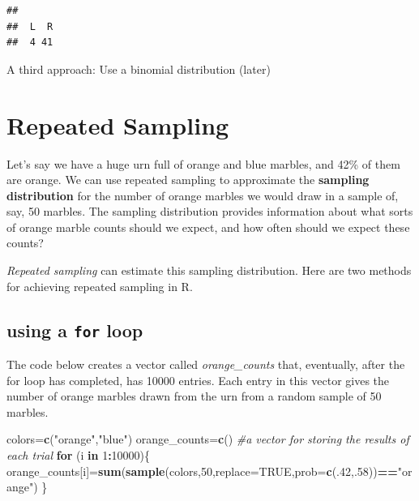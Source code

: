 \documentclass[
]{book}
\newenvironment{Shaded}{\begin{snugshade}}{\end{snugshade}}
\newcommand{\AttributeTok}[1]{\textcolor[rgb]{0.13,0.29,0.53}{#1}}
\newcommand{\CommentTok}[1]{\textcolor[rgb]{0.56,0.35,0.01}{\textit{#1}}}
\newcommand{\ConstantTok}[1]{\textcolor[rgb]{0.56,0.35,0.01}{#1}}
\newcommand{\ControlFlowTok}[1]{\textcolor[rgb]{0.13,0.29,0.53}{\textbf{#1}}}
\newcommand{\DecValTok}[1]{\textcolor[rgb]{0.00,0.00,0.81}{#1}}
\newcommand{\FunctionTok}[1]{\textcolor[rgb]{0.13,0.29,0.53}{\textbf{#1}}}
\newcommand{\NormalTok}[1]{#1}
\newcommand{\OtherTok}[1]{\textcolor[rgb]{0.56,0.35,0.01}{#1}}
\newcommand{\SpecialCharTok}[1]{\textcolor[rgb]{0.81,0.36,0.00}{\textbf{#1}}}
\newcommand{\StringTok}[1]{\textcolor[rgb]{0.31,0.60,0.02}{#1}}
\theoremstyle{definition}
\theoremstyle{definition}
\theoremstyle{definition}
\theoremstyle{definition}
\theoremstyle{remark}
\begin{document}
\begin{verbatim}
## 
##  L  R 
##  4 41
\end{verbatim}

A third approach: Use a binomial distribution (later)

\section{Repeated Sampling}\label{repeated-sampling}

Let's say we have a huge urn full of orange and blue marbles, and 42\% of them are orange. We can use repeated sampling to approximate the \textbf{sampling distribution} for the number of orange marbles we would draw in a sample of, say, 50 marbles.
The sampling distribution provides information about what sorts of orange marble counts should we expect, and how often should we expect these counts?

\emph{Repeated sampling} can estimate this sampling distribution. Here are two methods for achieving repeated sampling in R.

\subsection*{\texorpdfstring{using a \texttt{for} loop}{using a for loop}}\label{using-a-for-loop}

The code below creates a vector called \emph{orange\_counts} that, eventually, after the for loop has completed, has 10000 entries. Each entry in this vector gives the number of orange marbles drawn from the urn from a random sample of 50 marbles.

\begin{Shaded}
\begin{Highlighting}[]
\NormalTok{colors}\OtherTok{=}\FunctionTok{c}\NormalTok{(}\StringTok{"orange"}\NormalTok{,}\StringTok{"blue"}\NormalTok{)}
\NormalTok{orange\_counts}\OtherTok{=}\FunctionTok{c}\NormalTok{() }\CommentTok{\#a vector for storing the results of each trial}
\ControlFlowTok{for}\NormalTok{ (i }\ControlFlowTok{in} \DecValTok{1}\SpecialCharTok{:}\DecValTok{10000}\NormalTok{)\{}
\NormalTok{  orange\_counts[i]}\OtherTok{=}\FunctionTok{sum}\NormalTok{(}\FunctionTok{sample}\NormalTok{(colors,}\DecValTok{50}\NormalTok{,}\AttributeTok{replace=}\ConstantTok{TRUE}\NormalTok{,}\AttributeTok{prob=}\FunctionTok{c}\NormalTok{(.}\DecValTok{42}\NormalTok{,.}\DecValTok{58}\NormalTok{))}\SpecialCharTok{==}\StringTok{"orange"}\NormalTok{)}
\NormalTok{\}}
\end{Highlighting}
\end{Shaded}
\end{document}
